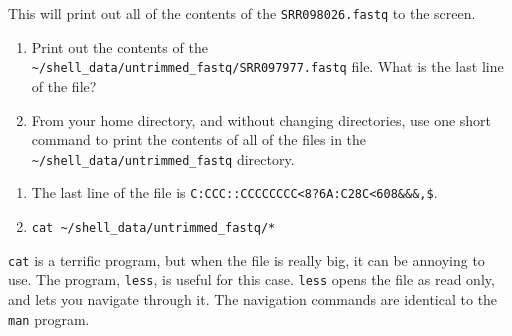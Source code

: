 \documentclass[
  letterpaper,
  DIV=11,
  numbers=noendperiod]{scrreprt}
\providecommand{\tightlist}{%
  \setlength{\itemsep}{0pt}\setlength{\parskip}{0pt}}\usepackage{longtable,booktabs,array}
\begin{document}
This will print out all of the contents of the \texttt{SRR098026.fastq}
to the screen.

\begin{tcolorbox}[enhanced jigsaw, opacitybacktitle=0.6, colback=white, coltitle=black, opacityback=0, rightrule=.15mm, toptitle=1mm, toprule=.15mm, bottomtitle=1mm, colframe=quarto-callout-caution-color-frame, arc=.35mm, titlerule=0mm, colbacktitle=quarto-callout-caution-color!10!white, leftrule=.75mm, title={Exercise}, breakable, bottomrule=.15mm, left=2mm]

\begin{enumerate}
\def\labelenumi{\arabic{enumi}.}
\tightlist
\item
  Print out the contents of the
  \texttt{\textasciitilde{}/shell\_data/untrimmed\_fastq/SRR097977.fastq}
  file. What is the last line of the file?
\item
  From your home directory, and without changing directories, use one
  short command to print the contents of all of the files in the
  \texttt{\textasciitilde{}/shell\_data/untrimmed\_fastq} directory.
\end{enumerate}

\end{tcolorbox}

\begin{tcolorbox}[enhanced jigsaw, opacitybacktitle=0.6, colback=white, coltitle=black, opacityback=0, rightrule=.15mm, toptitle=1mm, toprule=.15mm, bottomtitle=1mm, colframe=quarto-callout-caution-color-frame, arc=.35mm, titlerule=0mm, colbacktitle=quarto-callout-caution-color!10!white, leftrule=.75mm, title={Solution}, breakable, bottomrule=.15mm, left=2mm]

\begin{enumerate}
\def\labelenumi{\arabic{enumi}.}
\item
  The last line of the file is
  \texttt{C:CCC::CCCCCCCC\textless{}8?6A:C28C\textless{}608\textquotesingle{}\&\&\&,\textquotesingle{}\$}.
\item
  \texttt{cat\ \textasciitilde{}/shell\_data/untrimmed\_fastq/*}
\end{enumerate}

\end{tcolorbox}

\texttt{cat} is a terrific program, but when the file is really big, it
can be annoying to use. The program, \texttt{less}, is useful for this
case. \texttt{less} opens the file as read only, and lets you navigate
through it. The navigation commands are identical to the \texttt{man}
program.
\end{document}
